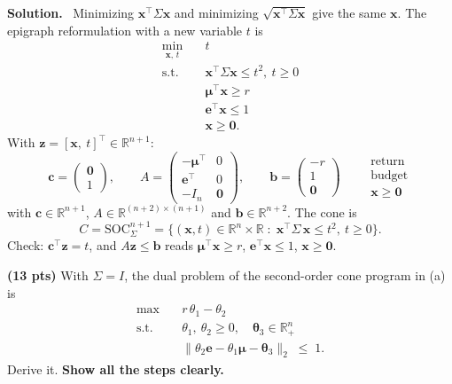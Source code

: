 \documentclass[10pt]{article}
\newenvironment{solution}
  {\par\smallskip\begingroup\color{solink}\textbf{Solution.}\ }
  {\par\endgroup}
\begin{document}
\begin{parts}
\begin{solution}
Minimizing $\bm{x}^{\top}\Sigma \bm{x}$ and minimizing $\sqrt{\bm{x}^{\top}\Sigma \bm{x}}$ give the same $\bm{x}$. The epigraph
reformulation with a new variable $t$ is
\[
\begin{aligned}
  \min_{\bm{x},\, t} \quad & t \\
  \text{s.t.} \quad & \bm{x}^{\top}\Sigma \bm{x} \le t^2,\ t \ge 0 \\
                    & \bm{\mu}^{\top}\bm{x} \ge r \\
                    & \bm{e}^{\top}\bm{x} \le 1 \\
                    & \bm{x} \ge \bm{0} .
\end{aligned}
\]
With $\bm{z} = [\bm{x},\ t]^{\top} \in \mathbb{R}^{n+1}$:
\[
  \bm{c} = \begin{pmatrix} \bm{0} \\ 1 \end{pmatrix}, \qquad
  A = \begin{pmatrix} -\bm{\mu}^{\top} & 0 \\ \bm{e}^{\top} & 0 \\ -I_n & \bm{0} \end{pmatrix}, \qquad
  \bm{b} = \begin{pmatrix} -r \\ 1 \\ \bm{0} \end{pmatrix}
  \qquad
  \begin{array}{l}
    \scriptstyle\text{return} \\ \scriptstyle\text{budget} \\ \scriptstyle \bm{x} \ge \bm{0}
  \end{array}
\]
with $\bm{c} \in \mathbb{R}^{n+1}$, $A \in \mathbb{R}^{(n+2) \times (n+1)}$ and $\bm{b} \in \mathbb{R}^{n+2}$. The cone is
\[
  C = \mathrm{SOC}_{\Sigma}^{n+1}
    = \big\{ (\bm{x}, t) \in \mathbb{R}^n \times \mathbb{R} \;:\; \bm{x}^{\top}\Sigma\, \bm{x} \le t^2,\ t \ge 0 \big\}.
\]
Check: $\bm{c}^{\top}\bm{z} = t$, and $A\bm{z} \le \bm{b}$ reads $\bm{\mu}^{\top}\bm{x} \ge r$, $\bm{e}^{\top}\bm{x} \le 1$, $\bm{x} \ge \bm{0}$.
\end{solution}

\item \textbf{(13 pts)} With $\Sigma = I$, the dual problem of the second-order cone program in (a) is
  \[
  \begin{aligned}
    \max \quad & r\,\theta_1 - \theta_2 \\
    \text{s.t.} \quad & \theta_1,\ \theta_2 \ge 0, \quad \bm{\theta}_3 \in \mathbb{R}^n_+ \\
                      & \|\theta_2 \bm{e} - \theta_1 \bm{\mu} - \bm{\theta}_3\|_2 \;\le\; 1 .
  \end{aligned}
  \]
  Derive it. \textbf{Show all the steps clearly.}


\end{parts}
\end{document}
